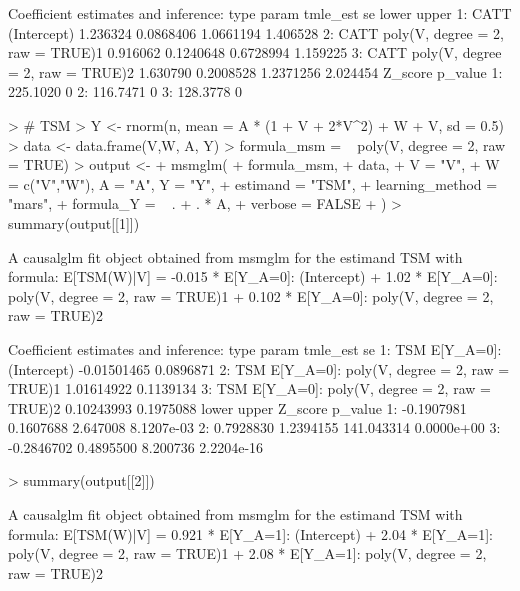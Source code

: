 \documentclass[article]{jss}
\begin{document}
\begin{Schunk}
\begin{Soutput}
Coefficient estimates and inference:
   type                            param tmle_est        se     lower    upper
1: CATT                      (Intercept) 1.236324 0.0868406 1.0661194 1.406528
2: CATT poly(V, degree = 2, raw = TRUE)1 0.916062 0.1240648 0.6728994 1.159225
3: CATT poly(V, degree = 2, raw = TRUE)2 1.630790 0.2008528 1.2371256 2.024454
    Z_score p_value
1: 225.1020       0
2: 116.7471       0
3: 128.3778       0
\end{Soutput}
\begin{Sinput}
> # TSM
> Y <- rnorm(n, mean = A * (1 + V + 2*V^2) + W + V, sd = 0.5)
> data <- data.frame(V,W, A, Y)
> formula_msm = ~ poly(V, degree = 2, raw = TRUE) 
> output <-
+   msmglm(
+     formula_msm,
+     data,
+     V = "V",
+     W = c("V","W"), A = "A", Y = "Y",
+     estimand = "TSM",
+     learning_method = "mars",
+     formula_Y = ~ . + . * A,
+     verbose = FALSE
+   )
> summary(output[[1]])
\end{Sinput}
\begin{Soutput}
A causalglm fit object obtained from msmglm for the estimand TSM with formula: 
E[TSM(W)|V] = -0.015 * E[Y_{A=0}]: (Intercept) + 1.02 * E[Y_{A=0}]: poly(V, degree = 2, raw = TRUE)1 + 0.102 * E[Y_{A=0}]: poly(V, degree = 2, raw = TRUE)2

Coefficient estimates and inference:
   type                                        param    tmle_est        se
1:  TSM                      E[Y_{A=0}]: (Intercept) -0.01501465 0.0896871
2:  TSM E[Y_{A=0}]: poly(V, degree = 2, raw = TRUE)1  1.01614922 0.1139134
3:  TSM E[Y_{A=0}]: poly(V, degree = 2, raw = TRUE)2  0.10243993 0.1975088
        lower     upper    Z_score    p_value
1: -0.1907981 0.1607688   2.647008 8.1207e-03
2:  0.7928830 1.2394155 141.043314 0.0000e+00
3: -0.2846702 0.4895500   8.200736 2.2204e-16
\end{Soutput}
\begin{Sinput}
> summary(output[[2]])
\end{Sinput}
\begin{Soutput}
A causalglm fit object obtained from msmglm for the estimand TSM with formula: 
E[TSM(W)|V] = 0.921 * E[Y_{A=1}]: (Intercept) + 2.04 * E[Y_{A=1}]: poly(V, degree = 2, raw = TRUE)1 + 2.08 * E[Y_{A=1}]: poly(V, degree = 2, raw = TRUE)2


\end{Soutput}
\end{Schunk}
\end{document}
